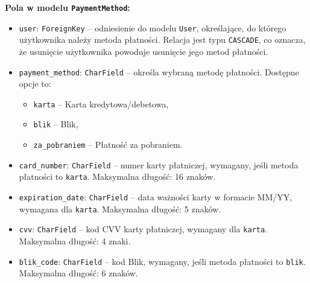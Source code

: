 \documentclass[12pt,a4paper,oneside]{article}
\theoremstyle{definition}
\numberwithin{equation}{section}
\begin{document}
\textbf{Pola w modelu \texttt{PaymentMethod}:}
\begin{itemize}
    \item \texttt{user}: \texttt{ForeignKey} – odniesienie do modelu \texttt{User}, określające, do którego użytkownika należy metoda płatności. Relacja jest typu \texttt{CASCADE}, co oznacza, że usunięcie użytkownika powoduje usunięcie jego metod płatności.
    \item \texttt{payment\_method}: \texttt{CharField} – określa wybraną metodę płatności. Dostępne opcje to:
    \begin{itemize}
        \item \texttt{karta} – Karta kredytowa/debetowa,
        \item \texttt{blik} – Blik,
        \item \texttt{za\_pobraniem} – Płatność za pobraniem.
    \end{itemize}
    \item \texttt{card\_number}: \texttt{CharField} – numer karty płatniczej, wymagany, jeśli metoda płatności to \texttt{karta}. Maksymalna długość: 16 znaków.
    \item \texttt{expiration\_date}: \texttt{CharField} – data ważności karty w formacie MM/YY, wymagana dla \texttt{karta}. Maksymalna długość: 5 znaków.
    \item \texttt{cvv}: \texttt{CharField} – kod CVV karty płatniczej, wymagany dla \texttt{karta}. Maksymalna długość: 4 znaki.
    \item \texttt{blik\_code}: \texttt{CharField} – kod Blik, wymagany, jeśli metoda płatności to \texttt{blik}. Maksymalna długość: 6 znaków.
\end{itemize}
\end{document}
